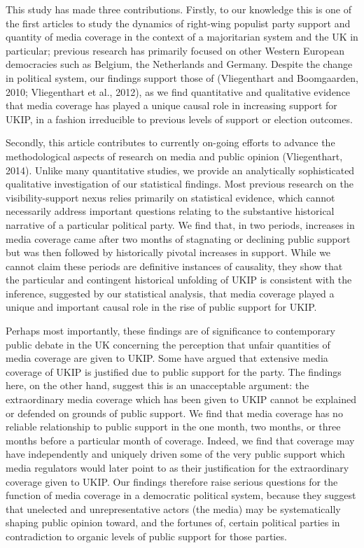 \documentclass[12pt,article]{article}
\begin{document}
This study has made three contributions. Firstly, to our knowledge this
is one of the first articles to study the dynamics of right-wing
populist party support and quantity of media coverage in the context of
a majoritarian system and the UK in particular; previous research has
primarily focused on other Western European democracies such as Belgium,
the Netherlands and Germany. Despite the change in political system, our
findings support those of (Vliegenthart and Boomgaarden, 2010;
Vliegenthart et al., 2012), as we find quantitative and qualitative
evidence that media coverage has played a unique causal role in
increasing support for UKIP, in a fashion irreducible to previous levels
of support or election outcomes.

Secondly, this article contributes to currently on-going efforts to
advance the methodological aspects of research on media and public
opinion (Vliegenthart, 2014). Unlike many quantitative studies, we
provide an analytically sophisticated qualitative investigation of our
statistical findings. Most previous research on the visibility-support
nexus relies primarily on statistical evidence, which cannot necessarily
address important questions relating to the substantive historical
narrative of a particular political party. We find that, in two periods,
increases in media coverage came after two months of stagnating or
declining public support but was then followed by historically pivotal
increases in support. While we cannot claim these periods are definitive
instances of causality, they show that the particular and contingent
historical unfolding of UKIP is consistent with the inference, suggested
by our statistical analysis, that media coverage played a unique and
important causal role in the rise of public support for UKIP.

Perhaps most importantly, these findings are of significance to
contemporary public debate in the UK concerning the perception that
unfair quantities of media coverage are given to UKIP. Some have argued
that extensive media coverage of UKIP is justified due to public support
for the party. The findings here, on the other hand, suggest this is an
unacceptable argument: the extraordinary media coverage which has been
given to UKIP cannot be explained or defended on grounds of public
support. We find that media coverage has no reliable relationship to
public support in the one month, two months, or three months before a
particular month of coverage. Indeed, we find that coverage may have
independently and uniquely driven some of the very public support which
media regulators would later point to as their justification for the
extraordinary coverage given to UKIP. Our findings therefore raise
serious questions for the function of media coverage in a democratic
political system, because they suggest that unelected and
unrepresentative actors (the media) may be systematically shaping public
opinion toward, and the fortunes of, certain political parties in
contradiction to organic levels of public support for those parties.
\end{document}
